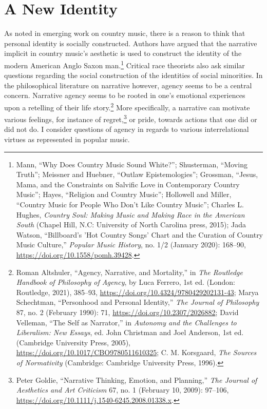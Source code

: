 \documentclass[phdthesis,12pt,final,a4paper]{wuthesis}
\theoremstyle{definition}
\theoremstyle{definition}
\theoremstyle{definition}
\theoremstyle{definition}
\theoremstyle{remark}
\begin{document}
\chapter{A New Identity}\label{a-new-identity}

As noted in emerging work on country music, there is a reason to think that personal identity is socially constructed. Authors have argued that the narrative implicit in country music's aesthetic is used to construct the identity of the modern American Anglo Saxon man.\footnote{Mann, {``Why Does Country Music Sound White?''}; Shusterman, {``Moving {Truth}''}; Meissner and Huebner, {``Outlaw Epistemologies''}; Grossman, {``Jesus, {Mama}, and the {Constraints} on {Salvific Love} in {Contemporary Country Music}''}; Hayes, {``Religion and {Country Music}''}; Hollowell and Miller, {``Country {Music} for {People Who Don}'t {Like Country Music}''}; Charles L. Hughes, \emph{Country Soul: Making Music and Making Race in the {American South}} (Chapel Hill, N.C: University of North Carolina press, 2015); Jada Watson, {``Billboard's '{Hot Country Songs}' Chart and the Curation of Country Music Culture,''} \emph{Popular Music History}, no. 1/2 (January 2020): 168--90, \url{https://doi.org/10.1558/pomh.39428}.} Critical race theorists also ask similar questions regarding the social construction of the identities of social minorities. In the philosophical literature on narrative however, agency seems to be a central concern. Narrative agency seems to be rooted in one's emotional experiences upon a retelling of their life story.\footnote{Roman Altshuler, {``Agency, Narrative, and Mortality,''} in \emph{The {Routledge Handbook} of {Philosophy} of {Agency}}, by Luca Ferrero, 1st ed. (London: Routledge, 2021), 385--93, \url{https://doi.org/10.4324/9780429202131-43}; Marya Schechtman, {``Personhood and {Personal Identity},''} \emph{The Journal of Philosophy} 87, no. 2 (February 1990): 71, \url{https://doi.org/10.2307/2026882}; David Velleman, {``The {Self} as {Narrator},''} in \emph{Autonomy and the {Challenges} to {Liberalism}: {New Essays}}, ed. John Christman and Joel Anderson, 1st ed. (Cambridge University Press, 2005), \url{https://doi.org/10.1017/CBO9780511610325}; C. M. Korsgaard, \emph{The Sources of Normativity} (Cambridge: Cambridge University Press, 1996).} More specifically, a narrative can motivate various feelings, for instance of regret,\footnote{Peter Goldie, {``Narrative {Thinking}, {Emotion}, and {Planning},''} \emph{The Journal of Aesthetics and Art Criticism} 67, no. 1 (February 10, 2009): 97--106, \url{https://doi.org/10.1111/j.1540-6245.2008.01338.x}.} or pride, towards actions that one did or did not do. I consider questions of agency in regards to various interrelational virtues as represented in popular music.
\end{document}
